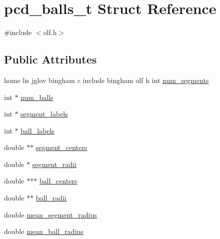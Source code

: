 \hypertarget{structpcd__balls__t}{
\section{pcd\_\-balls\_\-t Struct Reference}
\label{structpcd__balls__t}
}


{\ttfamily \#include $<$olf.h$>$}

\subsection*{Public Attributes}
\begin{DoxyCompactItemize}
\item 
home lis jglov bingham c include bingham olf h int \hyperlink{structpcd__balls__t_a4f67b1155f40c7e9d19ca0ccd0e44d41}{num\_\-segments}
\item 
int $\ast$ \hyperlink{structpcd__balls__t_a88da05a4699de3b68c6fffd113c5a54b}{num\_\-balls}
\item 
int $\ast$ \hyperlink{structpcd__balls__t_aeed65531f4d0aa9967c5de9e2636ea34}{segment\_\-labels}
\item 
int $\ast$ \hyperlink{structpcd__balls__t_ac938809b697f45105ecdc5bb136d00b3}{ball\_\-labels}
\item 
double $\ast$$\ast$ \hyperlink{structpcd__balls__t_acca3659164fdf56361516b17d793b856}{segment\_\-centers}
\item 
double $\ast$ \hyperlink{structpcd__balls__t_a8805787d802a4dd0d0895ef525c20d16}{segment\_\-radii}
\item 
double $\ast$$\ast$$\ast$ \hyperlink{structpcd__balls__t_a7d1e3915e85271fc3b84ea8896aca325}{ball\_\-centers}
\item 
double $\ast$$\ast$ \hyperlink{structpcd__balls__t_a7f37e3299ad6f5e57c87c91455188968}{ball\_\-radii}
\item 
double \hyperlink{structpcd__balls__t_a3d80371d7775a4954c290f071445ed97}{mean\_\-segment\_\-radius}
\item 
double \hyperlink{structpcd__balls__t_a4374bb4373788437e133d05ffe1c7cca}{mean\_\-ball\_\-radius}
\end{DoxyCompactItemize}


